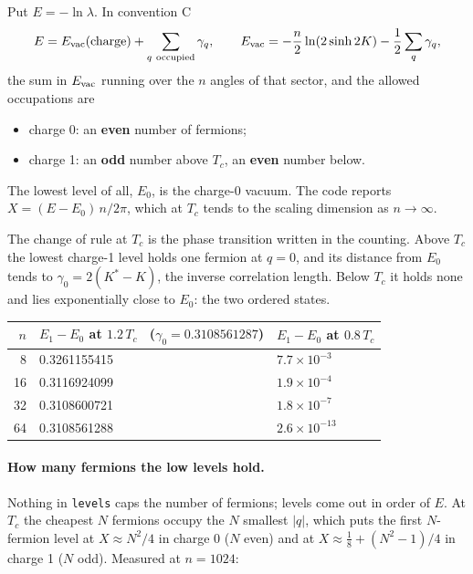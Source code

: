 \documentclass[11pt]{article}
\newcommand\code[1]{\texttt{#1}}
\begin{document}
Put $E = -\ln \lambda$.  In convention C
\begin{equation}
E = E_{\rm vac}({\rm charge}) + \sum_{q\ {\rm occupied}} \gamma_q ,
\qquad
E_{\rm vac} = -\frac{n}{2} \ln (2 \sinh 2K) - \frac12 \sum_{q} \gamma_q ,
\end{equation}
the sum in $E_{\rm vac}$ running over the $n$ angles of that sector, and the allowed occupations
are
\begin{itemize}
\item charge 0: an \textbf{even} number of fermions;
\item charge 1: an \textbf{odd} number above $T_c$, an \textbf{even} number below.
\end{itemize}
The lowest level of all, $E_0$, is the charge-0 vacuum.  The code reports
$X = (E - E_0)\, n / 2\pi$, which at $T_c$ tends to the scaling dimension as $n \to \infty$.

The change of rule at $T_c$ is the phase transition written in the counting.  Above $T_c$ the
lowest charge-1 level holds one fermion at $q = 0$, and its distance from $E_0$ tends to
$\gamma_0 = 2(K^* - K)$, the inverse correlation length.  Below $T_c$ it holds none and lies
exponentially close to $E_0$: the two ordered states.

\begin{center}\begin{tabular}{rll}
\toprule
$n$ & $E_1 - E_0$ at $1.2\,T_c$ \ ($\gamma_0 = 0.3108561287$) & $E_1 - E_0$ at $0.8\,T_c$ \\
\midrule
8 & 0.3261155415 & $7.7 \times 10^{-3}$ \\
16 & 0.3116924099 & $1.9 \times 10^{-4}$ \\
32 & 0.3108600721 & $1.8 \times 10^{-7}$ \\
64 & 0.3108561288 & $2.6 \times 10^{-13}$ \\
\bottomrule
\end{tabular}\end{center}

\paragraph{How many fermions the low levels hold.}  Nothing in \code{levels} caps the number of
fermions; levels come out in order of $E$.  At $T_c$ the cheapest $N$ fermions occupy the $N$
smallest $|q|$, which puts the first $N$-fermion level at $X \approx N^2/4$ in charge 0 ($N$
even) and at $X \approx \tfrac18 + (N^2 - 1)/4$ in charge 1 ($N$ odd).  Measured at $n = 1024$:
\end{document}
